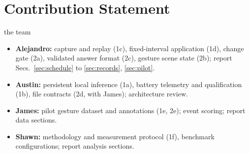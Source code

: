 \section*{Contribution Statement}
\begin{notes}{the team}
\begin{itemize}\setlength\itemsep{0pt}
\item \textbf{Alejandro:} capture and replay (1c), fixed-interval application (1d), change gate (2a), validated answer format (2c), gesture scene state (2b); report Secs.~\ref{sec:schedule} to \ref{sec:records}, \ref{sec:pilot}.
\item \textbf{Austin:} persistent local inference (1a), battery telemetry and qualification (1b), file contracts (2d, with James); architecture review.
\item \textbf{James:} pilot gesture dataset and annotations (1e, 2e); event scoring; report data sections.
\item \textbf{Shawn:} methodology and measurement protocol (1f), benchmark configurations; report analysis sections.
\end{itemize}
\end{notes}
